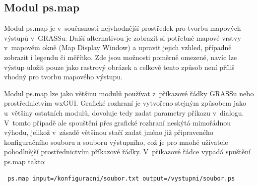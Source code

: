 \documentclass[a4paper,12pt,draft]{article}
\newif\ifbc %
\begin{document}
\ifbc
Nové grafické rozhraní \emph{wxGUI} bylo vyvíjeno od roku 2006 a je
dostupné od verze 6.4.  Skládá se ze dvou hlavních komponent -- \emph{Layer
Manager} a \emph{Map Display Window}, viz obr. č. \ref{fig:wxgui}. Layer
Manager spravuje mapové vrstvy, umožňuje spouštět GRASS moduly a zobrazuje
výstup programů. Map Display Window především zobrazuje mapové vrstvy
a ovládá pohled (přiblížení, posunutí). Většina modulů se ovládá
prostřednictvím dialogů generovaných z~XML popisu jejich rozhraní,
některé mají své samostatně vytvořené dialogy.
\begin{figure}[h!]
\centering
\subfloat[][Layer
Manager]{\texttt{[image: \%
./GUI\_screenshots/wxgui\_layer\_manager.png]} }
\quad
\subfloat[][Map Display
Window]{\texttt{[image: \%
./GUI\_screenshots/wxgui\_map\_display.png]}}
\caption{Dvě hlavní komponenty wxGUI v~GRASS 7\label{fig:wxgui}}

\end{figure}

Alternativou vlastního grafického rozhraní GRASS GIS, je již zmiňovaný
program QGIS. Díky úzké spolupráci obou programů, lze QGIS používat i jako GUI
pro GRASS a mnoho uživatelů si tento způsob oblíbilo.
\fi
\subsection{Modul ps.map}
\label{sec:psmap}
Modul ps.map je v~současnosti nejvhodnější prostředek pro tvorbu
mapových vý\-stupů v~GRASSu. Další alternativou je zobrazit si potřebné
mapové vrstvy v~mapovém okně (Map Display Window)  a upravit jejich vzhled,
případně zobrazit i legendu či měřítko. Zde jsou možnosti poměrně
omezené, navíc lze výstup uložit pouze jako rastrový obrázek a celkově
tento způsob není příliš vhodný pro tvorbu mapového výstupu.

Modul ps.map lze jako většinu modulů používat z~příkazové
řádky GRASSu nebo pro\-střed\-nic\-tvím wxGUI. Grafické rozhraní
je vytvořeno stejným způsobem jako u~většiny ostatních modulů,
dovoluje tedy zadat parametry příkazu v~dialogu. V~tomto případě ale
spouštění přes grafické rozhraní neskýtá mimořádnou výhodu,
jelikož v~zásadě většinou stačí zadat jméno již připraveného
konfiguračního souboru a souboru výstupního, což je pro mnohé uživatele
pohodlnější prostřednictvím příkazové řádky. V~příkazové řádce
vypadá spuštění ps.map takto:
\begin{verbatim}
 ps.map input=/konfiguracni/soubor.txt output=/vystupni/soubor.ps
\end{verbatim}
\end{document}
